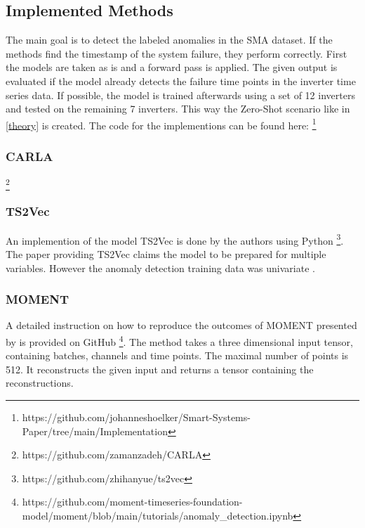 
\subsection{Implemented Methods}
The main goal is to detect the labeled anomalies in the SMA dataset. If the methods find the timestamp of the system failure, they perform correctly. First the models are taken as is and a forward pass is applied. The given output is evaluated if the model already detects the failure time points in the inverter time series data. If possible, the model is trained afterwards using a set of 12 inverters and tested on the remaining 7 inverters. This way the Zero-Shot scenario like in \ref{theory} is created.
The code for the implementions can be found here: \footnote{\fussy\tiny https://github.com/johanneshoelker/Smart-Systems-Paper/tree/main/Implementation}


%

\subsubsection{CARLA}
\footnote{\fussy\tiny https://github.com/zamanzadeh/CARLA}

\subsubsection{TS2Vec}
An implemention of the model TS2Vec is done by the authors using Python \footnote{\fussy\tiny https://github.com/zhihanyue/ts2vec}.
The paper providing TS2Vec claims the model to be prepared for multiple variables. However the anomaly detection training data was univariate \cite{yue_ts2vec_2022}.

\subsubsection{MOMENT}
A detailed instruction on how to reproduce the outcomes of MOMENT presented by \cite{goswami_moment_2024} is provided on GitHub \footnote{\fussy\tiny https://github.com/moment-timeseries-foundation-model/moment/blob/main/tutorials/anomaly\_detection.ipynb}. The method takes a three dimensional input tensor, containing batches, channels and time points. The maximal number of points is 512. It reconstructs the given input and returns a tensor containing the reconstructions.

